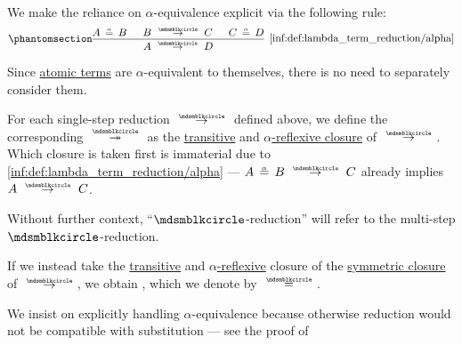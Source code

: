 \begin{definition}
\begin{thmenum}
    We make the reliance on \( \alpha \)-equivalence explicit via the following rule:
    \begin{equation*}\taglabel[\ensuremath{ \logic{Alpha}_{\Anon} }]{inf:def:lambda_term_reduction/alpha}
      \begin{prooftree}
        \hypo{ A \aequiv B }
        \hypo{ B \pred C }
        \hypo{ C \aequiv D }
        \infer3[\ref{inf:def:lambda_term_reduction/alpha}]{ A \pred D }.
      \end{prooftree}
    \end{equation*}

    Since \hyperref[def:lambda_term/atom]{atomic terms} are \( \alpha \)-equivalent to themselves, there is no need to separately consider them.

     For each single-step reduction \( {\pred} \) defined above, we define the corresponding  \( {\pred*} \) as the \hyperref[def:relation_closures/transitive]{transitive} and \hyperref[def:alpha_reflexive]{\( \alpha \)-reflexive closure} of \( {\pred} \). Which closure is taken first is immaterial due to \ref{inf:def:lambda_term_reduction/alpha} --- \( A \aequiv B \pred C \) already implies \( A \pred C \).

    Without further context, \enquote{\( {\Anon} \)-reduction} will refer to the multi-step \( {\Anon} \)-reduction.

     If we instead take the
    \hyperref[def:relation_closures/transitive]{transitive} and \hyperref[def:alpha_reflexive]{\( \alpha \)-reflexive} closure of the \hyperref[def:relation_closures/symmetric]{symmetric closure} of \( \pred \), we obtain , which we denote by \( {\equivrel{\Anon}} \).
  \end{thmenum}
\end{definition}
\begin{comments}
  \item We insist on explicitly handling \( \alpha \)-equivalence because otherwise reduction would not be compatible with substitution --- see the proof of 
\end{comments}

